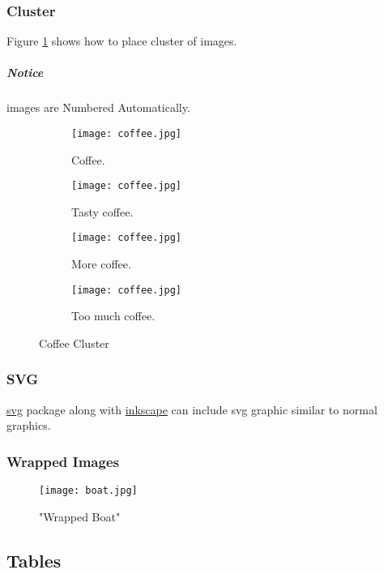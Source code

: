\documentclass{report}[a4paper,12pt] %
\begin{document}
\subsubsection{Cluster}
Figure \ref{fig:coffee3} shows how to place cluster of images.

\subparagraph{Notice} images are Numbered Automatically.

\begin{figure}[h!]
  \centering
  \begin{subfigure}[b]{0.2\linewidth}
    \texttt{[image: coffee.jpg]}
     \caption{Coffee.}
  \end{subfigure}
  \begin{subfigure}[b]{0.2\linewidth}
    \texttt{[image: coffee.jpg]}
    \caption{Tasty coffee.}
  \end{subfigure}
  \begin{subfigure}[b]{0.2\linewidth}
    \texttt{[image: coffee.jpg]}
    \caption{More coffee.}
  \end{subfigure}
  \begin{subfigure}[b]{0.5\linewidth}
    \texttt{[image: coffee.jpg]}
    \caption{Too much coffee.}
  \end{subfigure}
  \caption{Coffee Cluster}
  \label{fig:coffee3}
\end{figure}

\subsubsection{SVG}
\href{https://www.ctan.org/pkg/svg}{svg} package along with \href{https://wiki.archlinux.org/title/Inkscape}{inkscape}
can include svg graphic similar to normal graphics.



\subsubsection{Wrapped Images}
\begin{wrapfigure}{r}{0.5\linewidth}
  \centering
  \texttt{[image: boat.jpg]}
  \caption{"Wrapped Boat"}
  \label{fig:wboat}
\end{wrapfigure}
\lipsum[1]

\subsection{Tables}
\end{document}
